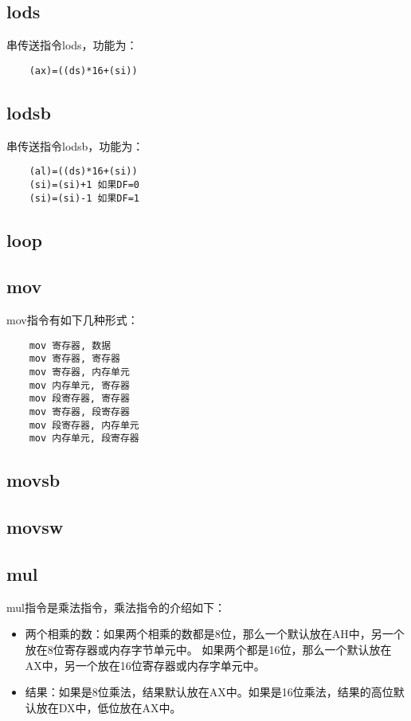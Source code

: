 \documentclass[a4paper,left=2.5cm,right=2.5cm,11pt]{article}
\begin{document}
\subsection{lods}
	串传送指令lods，功能为：
	\begin{lstlisting}
	(ax)=((ds)*16+(si))
	\end{lstlisting}

\subsection{lodsb}
	串传送指令lodsb，功能为：
	\begin{lstlisting}
	(al)=((ds)*16+(si))
	(si)=(si)+1 如果DF=0
	(si)=(si)-1 如果DF=1
	\end{lstlisting}

\subsection{loop}
\subsection{mov}
	mov指令有如下几种形式：
	\begin{lstlisting}
	mov 寄存器, 数据
	mov 寄存器, 寄存器
	mov 寄存器, 内存单元
	mov 内存单元, 寄存器
	mov 段寄存器, 寄存器
	mov 寄存器, 段寄存器
	mov 段寄存器, 内存单元
	mov 内存单元, 段寄存器
	\end{lstlisting}

\subsection{movsb}
\subsection{movsw}
\subsection{mul}
	mul指令是乘法指令，乘法指令的介绍如下：
	\begin{itemize}
		\item 两个相乘的数：如果两个相乘的数都是8位，那么一个默认放在AH中，另一个放在8位寄存器或内存字节单元中。
			如果两个都是16位，那么一个默认放在AX中，另一个放在16位寄存器或内存字单元中。
		\item 结果：如果是8位乘法，结果默认放在AX中。如果是16位乘法，结果的高位默认放在DX中，低位放在AX中。
	\end{itemize}
	
\end{document}
